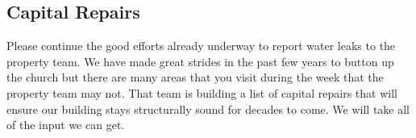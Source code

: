 \vspace{\fill}

\subsection{Capital Repairs}
\label{propertynotes}


Please continue the good efforts already underway to report water leaks to the property team.  We have made great strides in the past few years to button up the church but there are many areas that you visit during the week that the property team may not.  That team is building a list of capital repairs that will ensure our building stays structurally sound for decades to come.  We will take all of the input we can get.

\vspace{\fill}
